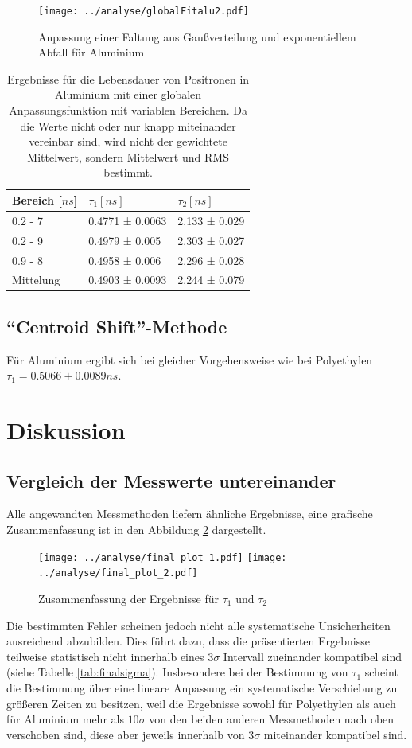 \documentclass[a4paper,12pt]{article}
\begin{document}
\begin{figure}[htb]
	\centering
	\texttt{[image: ../analyse/globalFitalu2.pdf]}
	\caption{Anpassung einer Faltung aus Gaußverteilung und exponentiellem Abfall für Aluminium}
	\label{fig:globalFitalu}
\end{figure}
\begin{table}[h]
	\begin{tabular}{l |l l}
		Bereich [$\si{ns}$] & $τ_1 [\si{ns}]$ & $τ_2 [\si{ns}]$ \\
		\hline
0.2 - 7 &  0.4771 ± 0.0063   &  2.133 ± 0.029  \\
0.2 - 9 &  0.4979 ± 0.005   &  2.303 ± 0.027  \\
0.9 - 8 &  0.4958 ± 0.006   &  2.296 ± 0.028  \\
		\hline
		\hline
		Mittelung & 0.4903 ± 0.0093 & 2.244 ± 0.079
	\end{tabular}
	\centering
	\caption{Ergebnisse für die Lebensdauer von Positronen in Aluminium mit einer globalen
	Anpassungsfunktion mit variablen Bereichen. Da die Werte nicht oder nur knapp miteinander
		vereinbar sind, wird nicht der gewichtete Mittelwert, sondern Mittelwert und RMS bestimmt.}
	\label{tab:globalPoly}
\end{table}

\FloatBarrier
\subsection{"`Centroid Shift"'-Methode}
Für Aluminium ergibt sich bei gleicher Vorgehensweise wie bei Polyethylen $τ_1 = 0.5066 \pm 0.0089
\si{ns}$.

\section{Diskussion}
\subsection{Vergleich der Messwerte untereinander}
Alle angewandten Messmethoden liefern ähnliche Ergebnisse, eine grafische Zusammenfassung ist in den
Abbildung \ref{fig:finalt} dargestellt.

\begin{figure}[h]
	\texttt{[image: ../analyse/final\_plot\_1.pdf]}
	\texttt{[image: ../analyse/final\_plot\_2.pdf]}
	\caption{Zusammenfassung der Ergebnisse für $\tau_{1}$ und $\tau_{2}$  }
	\label{fig:finalt}
\end{figure}

Die bestimmten Fehler scheinen jedoch nicht alle systematische Unsicherheiten ausreichend abzubilden.
Dies führt dazu, dass die präsentierten Ergebnisse teilweise statistisch nicht innerhalb eines $3\sigma$ Intervall
zueinander kompatibel sind (siehe Tabelle \ref{tab:finalsigma}). Insbesondere bei der Bestimmung von $\tau_{1}$ scheint die Bestimmung über eine
lineare Anpassung ein systematische Verschiebung zu größeren Zeiten zu besitzen, weil die Ergebnisse
sowohl für Polyethylen als auch für Aluminium mehr als
$10σ$ von den beiden anderen Messmethoden nach oben verschoben sind, diese aber jeweils innerhalb von
$3σ$ miteinander kompatibel sind.
\end{document}
